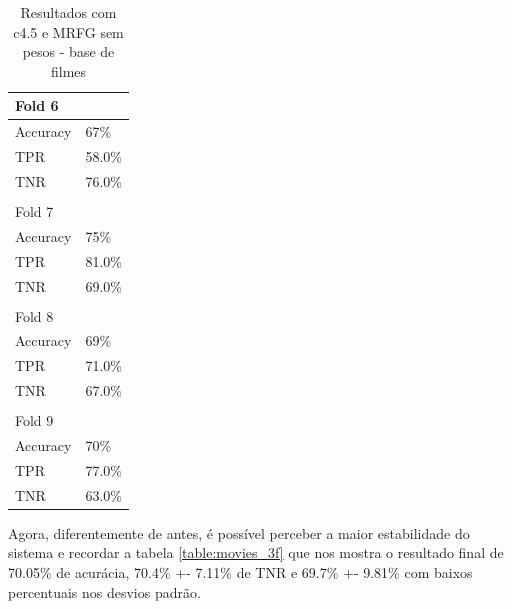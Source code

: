 \documentclass[template.tex]{subfiles}
\begin{document}
\begin{table}[H]
\begin{tabular}{ll}
	Fold 6 \\ \hline
    Accuracy &  67\% \\
	TPR &  58.0\% \\
	TNR &  76.0\% \\ \\
	
	Fold 7 \\ \hline
    Accuracy &  75\% \\
	TPR &  81.0\% \\
	TNR &  69.0\% \\ \\
	
	Fold 8 \\ \hline
    Accuracy &  69\% \\
	TPR &  71.0\% \\
	TNR &  67.0\% \\ \\
	
	Fold 9 \\ \hline
    Accuracy &  70\% \\
	TPR &  77.0\% \\
	TNR &  63.0\% \\
    \end{tabular}
    \caption{Resultados com c4.5 e MRFG sem pesos - base de filmes}
    \label{table:movie_folds_3}
\end{table}

Agora, diferentemente de antes, é possível perceber a maior estabilidade do sistema e recordar a tabela \ref{table:movies_3f} que nos mostra o resultado final de 70.05\% de acurácia, 70.4\% +- 7.11\% de TNR e 69.7\% +- 9.81\% com baixos percentuais nos desvios padrão.

%
\end{document}
